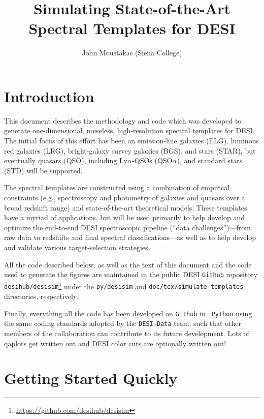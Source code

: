\documentclass[12pt]{article}
\begin{document}
\title{Simulating State-of-the-Art Spectral Templates for DESI} 

\author{John Moustakas (Siena College)}
\maketitle


\section{Introduction}

This document describes the methodology and code which was developed to generate
one-dimensional, noiseless, high-resolution spectral templates for DESI.  The
initial focus of this effort has been on emission-line galaxies (ELG), luminous
red galaxies (LRG), bright-galaxy survey galaxies (BGS), and stars (STAR), but
eventually quasars (QSO), including Ly$\alpha$-QSOs (QSO$\alpha$), and standard
stars (STD) will be supported.

The spectral templates are constructed using a combination of empirical
constraints (e.g., spectroscopy and photometry of galaxies and quasars over a
broad redshift range) and state-of-the-art theoretical models.  These templates
have a myriad of applications, but will be used primarily to help develop and
optimize the end-to-end DESI spectroscopic pipeline (``data challenges'')---from
raw data to redshifts and final spectral classifications---as well as to help
develop and validate various target-selection strategies.

All the code described below, as well as the text of this document and the code
used to generate the figures are maintained in the public DESI {\tt Github}
repository {\tt
  desihub/desisim}\footnote{\url{https://github.com/desihub/desisim}} under the
{\tt py/desisim} and {\tt doc/tex/simulate-templates} directories, respectively.

Finally, everything all the code has been developed on {\tt Github} in {\tt
  Python} using the same coding standards adopted by the {\tt DESI-Data} team,
such that other members of the collaboration can contribute to its future
development.   Lots of qaplots get written out and DESI color cuts are
optionally written out!

\section{Getting Started Quickly}
\end{document}
